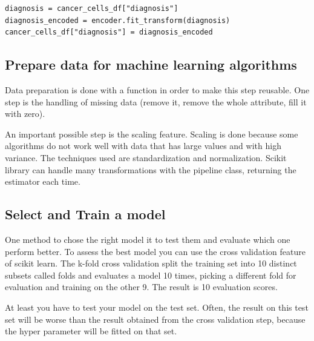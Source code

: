 \documentclass{article}
\begin{document}
\begin{lstlisting}
diagnosis = cancer_cells_df["diagnosis"]
diagnosis_encoded = encoder.fit_transform(diagnosis)
cancer_cells_df["diagnosis"] = diagnosis_encoded
\end{lstlisting}

\subsection{Prepare data for machine learning algorithms}
Data preparation is done with a function in order to make this step reusable.
One step is the handling of missing data (remove it, remove the whole attribute, fill it with zero).

An important possible step is the scaling feature. Scaling is done because some algorithms do not work well with data that has large values and with high variance. The techniques used are standardization and normalization.
Scikit library can handle many transformations with the pipeline class, returning the estimator each time.


\subsection{Select and Train a model}
One method to chose the right model it to test them and evaluate which one perform better. To assess the best model you can use the cross validation feature of scikit learn. The k-fold cross validation split the training set into 10 distinct subsets called folds and evaluates a model 10 times, picking a different fold for evaluation and training on the other 9. The result is 10 evaluation scores.

At least you have to test your model on the test set. Often, the result on this test set will be worse than the result obtained from the cross validation step, because the hyper parameter will be fitted on that set. 
\end{document}

